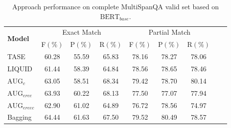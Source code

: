 \documentclass[a4paper,fleqn]{cas-dc}
\newcommand{\1}[1]{\mathds{1}\left[#1\right]}
\begin{document}
	\begin{table}[width=\textwidth,cols=9,pos=h]  %
		\caption{Approach performance on complete MultiSpanQA valid set based on $\text{BERT}_{base}$.} 
		\label{tab:bertall}
		\begin{tabular*}{\textwidth}{p{1.5cm}cccccccc}
			\toprule
			\multirow{2}{*}{\textbf{Model}} & \multicolumn{3}{c}{Exact Match} & \multicolumn{3}{c}{Partial Match}  \\
			\cline{2-7} 
			\addlinespace
			& F\((\%)\)           & P\((\%)\)          & R\((\%)\)           & F\((\%)\)          & P\((\%)\)           & R\((\%)\)           \\
			\midrule
			TASE   & 60.28         & 55.59         & 65.83         & 78.16         & 78.27         & 78.06         \\ 
			LIQUID & 61.44         & 58.39         & 64.84         & 78.56         & 78.65         & 78.46         \\
			$\text{AUG}_{c}$ & 63.05         & 58.51         & 68.34         & 79.42         & 78.70         & 80.14         \\
			$\text{AUG}_{eree}$  & 63.93          & 60.22         & 68.13          & 77.50         & 77.07          & 77.94         \\
			$\text{AUG}_{ereec}$ & 62.90          & 61.02        & 64.89          & 76.72         & 78.56          & 74.97         \\
			Bagging & 64.44          & 61.63        & 67.50          & 79.52         & 80.49          & 78.57         \\
			\bottomrule
		\end{tabular*}
	\end{table}
	
\end{document}
